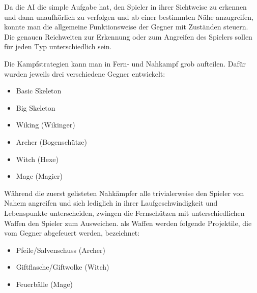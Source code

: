 Da die AI die simple Aufgabe hat, den Spieler in ihrer Sichtweise zu erkennen und dann unaufhörlich zu verfolgen und ab einer bestimmten Nähe anzugreifen, konnte man die allgemeine Funktionsweise der Gegner mit Zuständen steuern. Die genauen Reichweiten zur Erkennung oder zum Angreifen des Spielers sollen für jeden Typ unterschiedlich sein. 

Die Kampfstrategien kann man in Fern- und Nahkampf grob aufteilen. Dafür wurden jeweils drei verschiedene Gegner entwickelt:

\begin{itemize}
\item Basic Skeleton
\item Big Skeleton
\item Wiking (Wikinger)
\end{itemize}

\begin{itemize}
\item Archer (Bogenschütze)
\item Witch (Hexe)
\item Mage (Magier)
\end{itemize}

Während die zuerst gelisteten Nahkämpfer alle trivialerweise den Spieler von Nahem angreifen und sich lediglich in ihrer Laufgeschwindigkeit und Lebenspunkte unterscheiden, zwingen die Fernschützen mit unterschiedlichen Waffen den Spieler zum Ausweichen. als Waffen werden folgende Projektile, die vom Gegner abgefeuert werden, bezeichnet:

\begin{itemize}
\item Pfeile/Salvenschuss (Archer)
\item Giftflasche/Giftwolke (Witch)
\item Feuerbälle (Mage)
\end{itemize}

